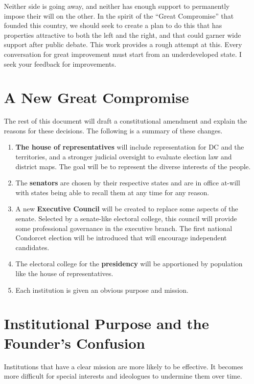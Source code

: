 \documentclass{article}
\begin{document}
Neither side is going away, and neither has enough support to permanently impose their will on the other. In the spirit of the “Great Compromise” that founded this country, we should seek to create a plan to do this that has properties attractive to both the left and the right, and that could garner wide support after public debate. This work provides a rough attempt at this. Every conversation for great improvement must start from an underdeveloped state. I seek your feedback for improvements.

\section{A New Great Compromise}

The rest of this document will draft a constitutional amendment and explain the reasons for these decisions. The following is a summary of these changes.\begin{enumerate}
  \item \textbf{The house of representatives} will include representation for DC and the territories, and a stronger judicial oversight to evaluate election law and district maps. The goal will be to represent the diverse interests of the people.
  \item The \textbf{senators} are chosen by their respective states and are in office at-will with states being able to recall them at any time for any reason.

  \item A new \textbf{Executive Council} will be created to replace some aspects of the senate. Selected by a senate-like electoral college, this council will provide some professional governance in the executive branch. The first national Condorcet election will be introduced that will encourage independent candidates.
  \item The electoral college for the \textbf{presidency} will be apportioned by population like the house of representatives.
 \item Each institution is given an obvious purpose and mission.
\end{enumerate}

\section{Institutional Purpose and the Founder’s Confusion}

Institutions that have a clear mission are more likely to be effective. It becomes more difficult for special interests and ideologues to undermine them over time.
\end{document}
